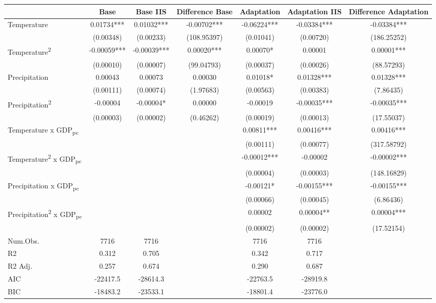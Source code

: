 \begin{table}
\centering
\begin{tabular}[t]{lcccccc}
\toprule
  & Base & Base IIS & Difference Base & Adaptation & Adaptation IIS & Difference Adaptation\\
\midrule
Temperature & 0.01734*** & 0.01032*** & -0.00702*** & -0.06224*** & -0.03384*** & -0.03384***\\
 & (0.00348) & (0.00233) & (108.95397) & (0.01041) & (0.00720) & (186.25252)\\
Temperature\textsuperscript{2} & -0.00059*** & -0.00039*** & 0.00020*** & 0.00070* & 0.00001 & 0.00001***\\
 & (0.00010) & (0.00007) & (99.04793) & (0.00037) & (0.00026) & (88.57293)\\
Precipitation & 0.00043 & 0.00073 & 0.00030 & 0.01018* & 0.01328*** & 0.01328***\\
 & (0.00111) & (0.00074) & (1.97683) & (0.00563) & (0.00383) & (7.86435)\\
Precipitation\textsuperscript{2} & -0.00004 & -0.00004* & 0.00000 & -0.00019 & -0.00035*** & -0.00035***\\
 & (0.00003) & (0.00002) & (0.46262) & (0.00019) & (0.00013) & (17.55037)\\
Temperature x GDP\textsubscript{pc} &  &  &  & 0.00811*** & 0.00416*** & 0.00416***\\
 &  &  &  & (0.00111) & (0.00077) & (317.58792)\\
Temperature\textsuperscript{2} x GDP\textsubscript{pc} &  &  &  & -0.00012*** & -0.00002 & -0.00002***\\
 &  &  &  & (0.00004) & (0.00003) & (148.16829)\\
Precipitation x GDP\textsubscript{pc} &  &  &  & -0.00121* & -0.00155*** & -0.00155***\\
 &  &  &  & (0.00066) & (0.00045) & (6.86436)\\
Precipitation\textsuperscript{2} x GDP\textsubscript{pc} &  &  &  & 0.00002 & 0.00004** & 0.00004***\\
 &  &  &  & (0.00002) & (0.00002) & (17.52154)\\
\midrule
Num.Obs. & 7716 & 7716 &  & 7716 & 7716 & \\
R2 & 0.312 & 0.705 &  & 0.342 & 0.717 & \\
R2 Adj. & 0.257 & 0.674 &  & 0.290 & 0.687 & \\
AIC & -22417.5 & -28614.3 &  & -22763.5 & -28919.8 & \\
BIC & -18483.2 & -23533.1 &  & -18801.4 & -23776.0 & \\

\end{tabular}
\end{table}
